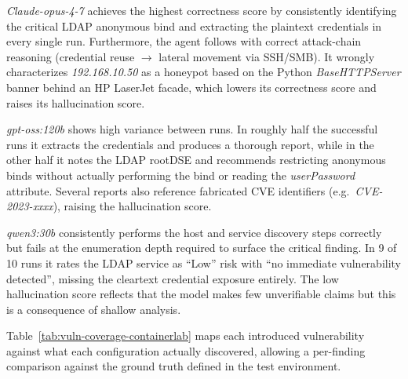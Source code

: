 \textit{Claude-opus-4-7} achieves the highest correctness score by consistently identifying
the critical \gls{LDAP} anonymous bind and extracting the plaintext credentials in every
single run.
Furthermore, the agent follows with correct attack-chain reasoning (credential reuse $\rightarrow$ lateral movement
via \gls{SSH}/\gls{SMB}).
It wrongly characterizes \textit{192.168.10.50} as a honeypot based on the
Python \textit{BaseHTTPServer} banner behind an HP LaserJet facade, which lowers its correctness score
and raises its hallucination score.

\textit{gpt-oss:120b} shows high variance between runs.
In roughly half the successful runs it extracts the credentials and produces a thorough report,
while in the other half it notes the \gls{LDAP} rootDSE and recommends restricting
anonymous binds without actually performing
the bind or reading the \textit{userPassword} attribute.
Several reports also reference fabricated CVE identifiers (e.g.\ \textit{CVE-2023-xxxx}),
raising the hallucination score.

\textit{qwen3:30b} consistently performs the host and service discovery steps correctly but
fails at the enumeration depth required to surface the critical finding.
In 9 of 10 runs it rates the \gls{LDAP} service as ``Low'' risk with ``no immediate
vulnerability detected'', missing the cleartext credential exposure entirely.
The low hallucination score reflects that the model makes few unverifiable claims \textthreequartersemdash but
this is a consequence of shallow analysis.

Table~\ref{tab:vuln-coverage-containerlab} maps each introduced vulnerability against what
each configuration actually discovered, allowing a per-finding comparison against the
ground truth defined in the test environment.

